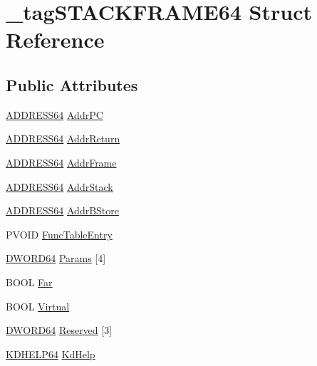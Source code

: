 \hypertarget{struct__tag_s_t_a_c_k_f_r_a_m_e64}{\section{\-\_\-tag\-S\-T\-A\-C\-K\-F\-R\-A\-M\-E64 Struct Reference}
\label{struct__tag_s_t_a_c_k_f_r_a_m_e64}
}
\subsection*{Public Attributes}
\begin{DoxyCompactItemize}
\item 
\hyperlink{_stack_walker_8cpp_a1a2de8bf22d3662a667f5aeb85fb6d5e}{A\-D\-D\-R\-E\-S\-S64} \hyperlink{struct__tag_s_t_a_c_k_f_r_a_m_e64_aeb58d43aa24639a87bb9b866234c9c3e}{Addr\-P\-C}
\item 
\hyperlink{_stack_walker_8cpp_a1a2de8bf22d3662a667f5aeb85fb6d5e}{A\-D\-D\-R\-E\-S\-S64} \hyperlink{struct__tag_s_t_a_c_k_f_r_a_m_e64_a58ebe13426a8177b4d0198149661b7fb}{Addr\-Return}
\item 
\hyperlink{_stack_walker_8cpp_a1a2de8bf22d3662a667f5aeb85fb6d5e}{A\-D\-D\-R\-E\-S\-S64} \hyperlink{struct__tag_s_t_a_c_k_f_r_a_m_e64_a65c9b5731b01b0093ec2abb6b0af2664}{Addr\-Frame}
\item 
\hyperlink{_stack_walker_8cpp_a1a2de8bf22d3662a667f5aeb85fb6d5e}{A\-D\-D\-R\-E\-S\-S64} \hyperlink{struct__tag_s_t_a_c_k_f_r_a_m_e64_a90e652f938dac9417243639b9916ff0d}{Addr\-Stack}
\item 
\hyperlink{_stack_walker_8cpp_a1a2de8bf22d3662a667f5aeb85fb6d5e}{A\-D\-D\-R\-E\-S\-S64} \hyperlink{struct__tag_s_t_a_c_k_f_r_a_m_e64_ae654493bfdc5eaac6328223048f168e5}{Addr\-B\-Store}
\item 
P\-V\-O\-I\-D \hyperlink{struct__tag_s_t_a_c_k_f_r_a_m_e64_a4c9da01675507c9ded96289c243bb9d7}{Func\-Table\-Entry}
\item 
\hyperlink{_stack_walker_8h_a97fb241c597b99bcb965858f53cacac4}{D\-W\-O\-R\-D64} \hyperlink{struct__tag_s_t_a_c_k_f_r_a_m_e64_a399ef7f5b10fe7afe8121c5045d2c27e}{Params} \mbox{[}4\mbox{]}
\item 
B\-O\-O\-L \hyperlink{struct__tag_s_t_a_c_k_f_r_a_m_e64_aeab4e464df825039002383ba2ac5688b}{Far}
\item 
B\-O\-O\-L \hyperlink{struct__tag_s_t_a_c_k_f_r_a_m_e64_a51304e7563d86c3aa68b1783781665a3}{Virtual}
\item 
\hyperlink{_stack_walker_8h_a97fb241c597b99bcb965858f53cacac4}{D\-W\-O\-R\-D64} \hyperlink{struct__tag_s_t_a_c_k_f_r_a_m_e64_aeb36e238f4a64f7c02a1930bb7d85732}{Reserved} \mbox{[}3\mbox{]}
\item 
\hyperlink{_stack_walker_8cpp_a6ad1f5acfd6357df080e9f4155b09aff}{K\-D\-H\-E\-L\-P64} \hyperlink{struct__tag_s_t_a_c_k_f_r_a_m_e64_af90fbefe711e4ba0f43bb67535fea15e}{Kd\-Help}
\end{DoxyCompactItemize}


